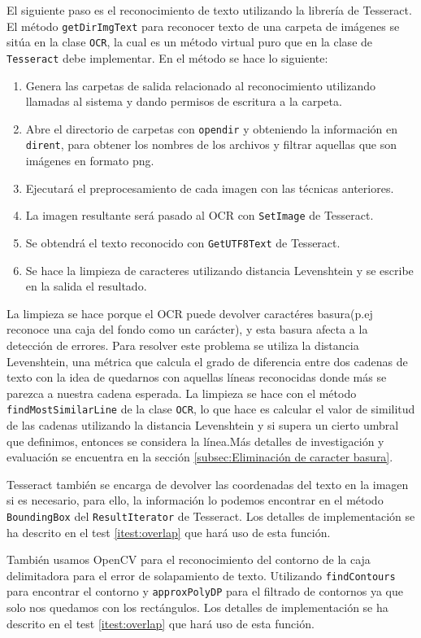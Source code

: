 El siguiente paso es el reconocimiento de texto utilizando la librería de Tesseract. El método \texttt{getDirImgText} para reconocer texto de una carpeta de imágenes se sitúa en la clase \texttt{OCR}, la cual es un método virtual puro que en la clase de \texttt{Tesseract} debe implementar. En el método se hace lo siguiente: 
\begin{enumerate}
	\item Genera las carpetas de salida relacionado al reconocimiento utilizando llamadas al sistema y dando permisos de escritura a la carpeta.
	\item Abre el directorio de carpetas con \texttt{opendir} y obteniendo la información en \texttt{dirent}, para obtener los nombres de los archivos y filtrar aquellas que son imágenes en formato png.
	\item Ejecutará el preprocesamiento de cada imagen con las técnicas anteriores.
	\item La imagen resultante será pasado al OCR con \texttt{SetImage} de Tesseract.
	\item Se obtendrá el texto reconocido con \texttt{GetUTF8Text} de Tesseract.
	\item Se hace la limpieza de caracteres utilizando distancia Levenshtein y se escribe en la salida el resultado.
\end{enumerate}
La limpieza se hace porque el OCR puede devolver caractéres basura(p.ej reconoce una caja del fondo como un carácter), y esta basura afecta a la detección de errores. Para resolver este problema se utiliza la distancia Levenshtein, una métrica que calcula el grado de diferencia entre dos cadenas de texto con la idea de quedarnos con aquellas líneas reconocidas donde más se parezca a nuestra cadena esperada. 
La limpieza se hace con el método \texttt{findMostSimilarLine} de la clase \texttt{OCR}, lo que hace es calcular el valor de similitud de las cadenas utilizando la distancia Levenshtein y si supera un cierto umbral que definimos, entonces se considera la línea.Más detalles de investigación y evaluación se encuentra en la sección \ref{subsec:Eliminación de caracter basura}.

Tesseract también se encarga de devolver las coordenadas del texto en la imagen si es necesario, para ello, la información lo podemos encontrar en el método \texttt{BoundingBox} del \texttt{ResultIterator} de Tesseract. Los detalles de implementación se ha descrito en el test \ref{itest:overlap} que hará uso de esta función.

También usamos OpenCV para el reconocimiento del contorno de la caja delimitadora para el error de solapamiento de texto. Utilizando \texttt{findContours} para encontrar el contorno y \texttt{approxPolyDP} para el filtrado de contornos ya que solo nos quedamos con los rectángulos. Los detalles de implementación se ha descrito en el test \ref{itest:overlap} que hará uso de esta función.

